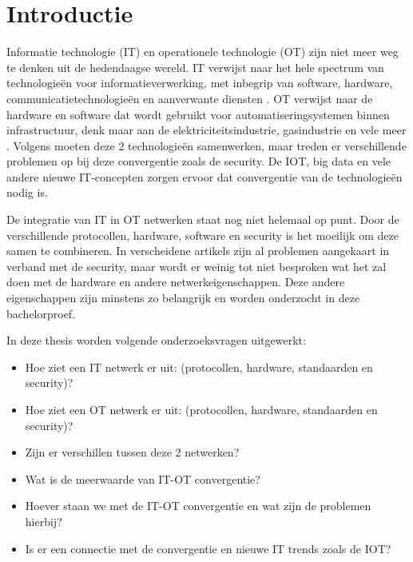 
\section{Introductie} %
\label{sec:introductie}

Informatie technologie (IT) en operationele technologie (OT) zijn niet meer weg te denken uit de hedendaagse wereld. IT verwijst naar het hele spectrum van technologieën voor informatieverwerking, met inbegrip van software, hardware, communicatietechnologieën en aanverwante diensten  \autocite{SecureiconTeam2019}. OT verwijst naar de hardware en software dat wordt gebruikt voor automatiseringsystemen binnen infrastructuur, denk maar aan de elektriciteitsindustrie, gasindustrie en vele meer \autocite{Murray}. Volgens \textcite{Hayes2020} moeten deze 2 technologieën samenwerken, maar treden er verschillende problemen op bij deze convergentie zoals de security. De IOT, big data en vele andere nieuwe IT-concepten zorgen ervoor dat convergentie van de technologieën nodig is.

De integratie van IT in OT netwerken staat nog niet helemaal op punt. Door de verschillende protocollen, hardware, software en security is het moeilijk om deze samen te combineren. In verscheidene artikels zijn al problemen aangekaart in verband met de security, maar wordt er weinig tot niet besproken wat het zal doen met de hardware en andere netwerkeigenschappen. Deze andere eigenschappen zijn minstens zo belangrijk en worden onderzocht in deze bachelorproef.

In deze thesis worden volgende onderzoeksvragen uitgewerkt:
\begin{itemize}
    \item Hoe ziet een IT netwerk er uit: (protocollen, hardware, standaarden en security)?
    \item Hoe ziet een OT netwerk er uit: (protocollen, hardware, standaarden en security)?
    \item Zijn er verschillen tussen deze 2 netwerken?
    \item Wat is de meerwaarde van IT-OT convergentie?
    \item Hoever staan we met de IT-OT convergentie en wat zijn de problemen hierbij?  
    \item Is er een connectie met de convergentie en nieuwe IT trends zoals de IOT?
    
\end{itemize}  


